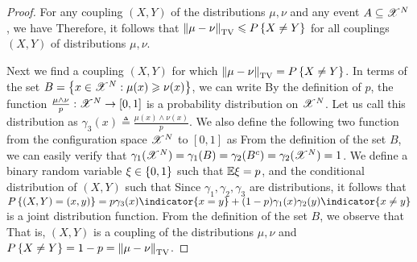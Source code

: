 \documentclass[letterpaper,english,10pt]{article}
\begin{document}
\begin{proof}
For any coupling $(X,Y)$ of the distributions $\mu, \nu$ and any event $A \subseteq \mathscr{X}^N$, we have 
Therefore, it follows that $\left\lVert\mu-\nu\right\rVert_{\text{TV}}  \leqslant P\left\{X\neq Y\right\}$ for all  couplings $(X,Y)$ of distributions $\mu, \nu$. 

Next we find a coupling $(X,Y)$ for which $ \left\lVert\mu-\nu\right\rVert_{\text{TV}} = P\left\{X \neq Y\right\}$. 
In terms of the set $B  = \left\{x \in \mathscr{X}^N: \mu(x) \geqslant \nu(x)\right\}$, we can write
By the definition of $p$, the function $\frac{\mu\wedge\nu}{p}: \mathscr{X}^N \to [0,1]$ is a probability distribution on $\mathscr{X}^N$. 
Let us call this distribution as $\gamma_3(x) \triangleq \frac{\mu(x)\wedge\nu(x)}{p}$. 
We also define the following two function from the configuration space $\mathscr{X}^N$ to $[0,1]$ as  
From the definition of the set $B$, we can easily verify that $\gamma_1(\mathscr{X}^N) = \gamma_1(B) = \gamma_2(B^c) = \gamma_2(\mathscr{X}^N) = 1$. 
We define a binary random variable $\xi \in \left\{0,1\right\}$ such that $\mathbb{E} \xi = p$, 
and the conditional distribution of $(X,Y)$ such that 
Since $\gamma_1, \gamma_2, \gamma_3$ are distributions, it follows that $P\set{(X,Y) = (x,y)} = p\gamma_3(x)\indicator{x = y} + (1-p)\gamma_1(x)\gamma_2(y)\indicator{x\neq y}$ is a joint distribution function. 
From the definition of the set $B$, we observe that 
That is, $(X,Y)$ is a coupling of the distributions $\mu, \nu$ and $P\left\{X \neq Y\right\} = 1-p = \left\lVert\mu - \nu\right\rVert_{\text{TV}}$. 
\end{proof}
\end{document}
